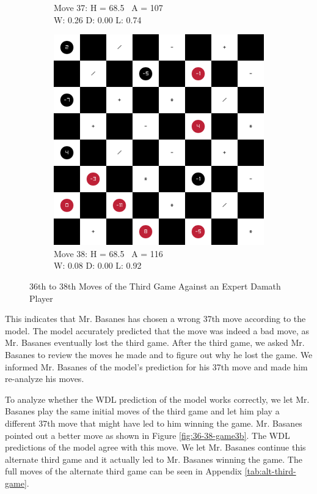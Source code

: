 \begin{figure}[H]
\begin{subfigure}{0.3\textwidth}
        \caption*{Move 37:  H = 68.5 \textbar\ A = 107\\ W: 0.26 D: 0.00 L: 0.74}
    \end{subfigure}
    \quad
    \begin{subfigure}{0.3\textwidth}
        \centering
        \includegraphics[width=\textwidth]{images/games/game3/move_39.png}
        \caption*{Move 38:  H = 68.5 \textbar\ A = 116 \\ W: 0.08 D: 0.00 L: 0.92}
    \end{subfigure}
    \caption{36th to 38th Moves of the Third Game Against an Expert Damath Player}
    \label{fig:36-38-game3}
\end{figure}

This indicates that Mr. Basanes has chosen a wrong 37th move according to the model. The model accurately predicted that the move was indeed a bad move, as Mr. Basanes eventually lost the third game. After the third game, we asked Mr. Basanes to review the moves he made and to figure out why he lost the game. We informed Mr. Basanes of the model's prediction for his 37th move and made him re-analyze his moves. 

To analyze whether the WDL prediction of the model works correctly, we let Mr. Basanes play the same initial moves of the third game and let him play a different 37th move that might have led to him winning the game. Mr. Basanes pointed out a better move as shown in Figure \ref{fig:36-38-game3b}. The WDL predictions of the model agree with this move. We let Mr. Basanes continue this alternate third game and it actually led to Mr. Basanes winning the game. The full moves of the alternate third game can be seen in Appendix \ref{tab:alt-third-game}.


